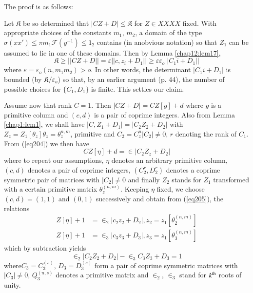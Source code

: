 The proof is as follows:

Let $\mathfrak{K}$ be so determined that $|CZ + D | \leq \mathfrak{K}$
for $Z \in XXXX $ 
fixed. With appropriate choices of the constants $m_1$, $m_2$, a domain
of the type $\sigma (x x') \leq \pi m_1 \mathscr{F} (y^{-1}) \leq 1_2$
contains (in an\pageoriginale obvious notation) so that $Z_1$ can be
assumed to lie 
in one of these domains. Then by Lemma \ref{chap12:lem17},  
$$
\mathfrak{K} \geq || CZ + D || = \varepsilon || c, z_i + D_1 || \geq
\varepsilon \varepsilon_o || C_1 i + D_1 ||  
$$
where $\varepsilon = \varepsilon_o (n , m _1 m_2) > o$. In other
words, the determinant $|C_1 i + D_1|$ is bounded (by $\mathfrak{K} /
\varepsilon_o$) so that, by an earlier argument (p. 44), the number
of possible choices for $\{ C_1 , D_1\}$ is finite. This settles our
claim. 

Assume now that rank $C= 1$. Then $|CZ + D | = CZ [g] +d$ where $g$ is
a primitive column and $(c,d)$ is a pair of coprime integers. Also from
Lemma \ref{chap1:lem1}, we shall have $| C, Z_1 + D_1 | = |C_2 Z_2 +
D_2 |$ with 
$Z_z = Z_1 [\theta _z] \theta_z = \theta_z^{n,m}$, primitive and $C_2
= C^n_z | C_2 | \neq 0$, $r$ denoting the rank of $C_1$. From (\ref{eq204})
we then have 
\begin{equation*}
CZ [\eta] + d = \in |C_2 Z_z + D_2| \tag{205}\label{eq205}  
\end{equation*}
where to repeat our assumptions, $\eta$ denotes an arbitrary primitive
column, $(c,d)$ denotes a pair of coprime integers, $(C_2^r , D_2^r)$
denotes a coprime symmetric pair of matrices with $|C_2| \neq 0$ and
finally $Z_2$ stands for $Z_1$ transformed with a  certain primitive
matrix $\theta^{(n,m)}_{z}$. Keeping $\eta$ fixed, we choose $(c,d ) =
(1,1)$ and $(0,1)$ successively and obtain from (\ref{eq205}), the relations 
\begin{align*}
Z [\eta ] + 1 & = \in_2|c_2 z_2 + D_2 |, z_2 = z_1
[\theta^{(n,m)}_{2}]\\ 
 Z [\eta ] + 1& = \in_3 |c_3 z_3 + D_3 |, z_3 = z_1
 [\theta^{(n,m)}_{3}] \tag*{$(205)'$}\label{eq205'}  
\end{align*}
which by subtraction yields
\begin{equation}
\in_2 |C_2 Z_2 + D_2 |- \in_3 C_3 Z_3 + D_3 =1
\tag{206}\label{eq206}  
\end{equation}
where\pageoriginale $C_3 = C_3^{(s)}$, $D_3 = D_3 ^{(s)}$ form a pair
of coprime symmetric matrices with $|C_3| \neq 0$, $Q_3 ^{(n,s)}$
denotes a primitive matrix and $\in_2$, $\in_3$ stand for $k^{\rm th}$
roots of unity.  

